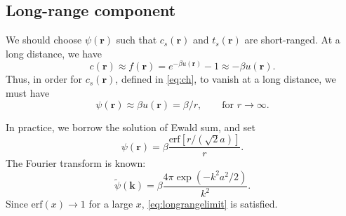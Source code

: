 \documentclass[12pt]{article}
\newcommand{\vct}[1]{\mathbf{#1}}
\providecommand{\vr}{} %
\renewcommand{\vr}{\vct{r}}
\newcommand{\vk}{\vct{k}}
\newcommand{\erf}{\mathrm{erf}}
\begin{document}
\subsection{Long-range component}

We should choose $\psi(\vr)$ such that $c_s(\vr)$ and $t_s(\vr)$ are short-ranged.
%
At a long distance, we have
\[
  c(\vr) \approx f(\vr)
         = e^{-\beta u(\vr)} - 1
         \approx -\beta u(\vr).
\]
Thus, in order for $c_s(\vr)$, defined in \eqref{eq:ch}, to vanish at a long distance,
we must have
\begin{equation}
  \psi(\vr) \approx \beta u(\vr)
            = \beta/r,
  \qquad \mbox{for $r \rightarrow \infty$}.
\label{eq:longrangelimit}
\end{equation}

In practice, we borrow the solution of Ewald sum, and set
\[
  \psi(\vr) = \beta \frac{ \erf\left[ r/(\sqrt{2} a) \right] }{ r }.
\]
The Fourier transform is known:
\[
  \tilde{\psi}(\vk) = \beta \frac{ 4 \pi \exp(-k^2 a^2/2) } { k^2 }.
\]
Since $\erf(x) \rightarrow 1$ for a large $x$,
\eqref{eq:longrangelimit} is satisfied.
\end{document}
